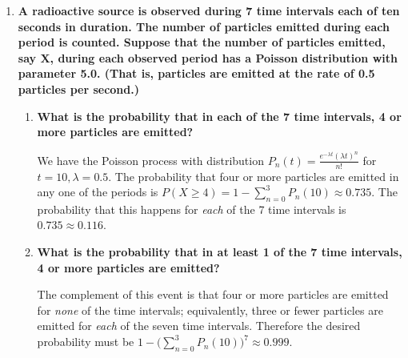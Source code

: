 \documentclass[10pt, oneside]{article}
\begin{document}
\begin{enumerate}[label=8.\arabic*]
In short, the strategy to approaching this problem is to consider all of the mutually exclusive events of a) the typos being relatively concentrated (the most being all 43 typos on one page) to relatively spread out (one typo across 43 pages) and each combination of distribution of typos, b) the number of pages on which the typos are on (ranging from 1 to 43) and each combination of the distribution of such typo-ridden pages, and taking each of these events, summing the mutually exclusive probabilities of choosing 10 typo-free pages.

\item  \begin{tcolorbox}[
  colback=Cerulean!5!white,
  colframe=Cerulean!75!black]
\textbf{A radioactive source is observed during 7 time intervals each of ten seconds in duration. The number of particles emitted during each period is counted. Suppose that the number of particles emitted, say $\bm{X}$, during each observed period has a Poisson distribution with parameter 5.0. (That is, particles are emitted at the rate of 0.5 particles per second.)}
\end{tcolorbox}

	\begin{enumerate}
	\item  \begin{tcolorbox}[
	  colback=Cerulean!5!white,
	  colframe=Cerulean!75!black]
	\textbf{What is the probability that in each of the 7 time intervals, 4 or more particles are emitted?}
	\end{tcolorbox}
	
	We have the Poisson process with distribution $P_n (t) = \frac{e^{-\lambda t} (\lambda t)^n}{n!}$ for $t = 10, \lambda = 0.5$. The probability that four or more particles are emitted in any one of the periods is $P(X \geq 4) = 1 - \sum^3_{n = 0} P_n (10) \approx 0.735$. The probability that this happens for \textit{each} of the 7 time intervals is $0.735 \approx \boxed{0.116}$.
	
	\item  \begin{tcolorbox}[
	  colback=Cerulean!5!white,
	  colframe=Cerulean!75!black]
	\textbf{What is the probability that in at least 1 of the 7 time intervals, 4 or more particles are emitted?}
	\end{tcolorbox}
	
	The complement of this event is that four or more particles are emitted for \textit{none} of the time intervals; equivalently, three or fewer particles are emitted for \textit{each} of the seven time intervals. Therefore the desired probability must be $1 - \Big( \sum^3_{n=0} P_n (10) \Big)^7 \approx \boxed{0.999}$.
	\end{enumerate}


\end{enumerate}
\end{document}
